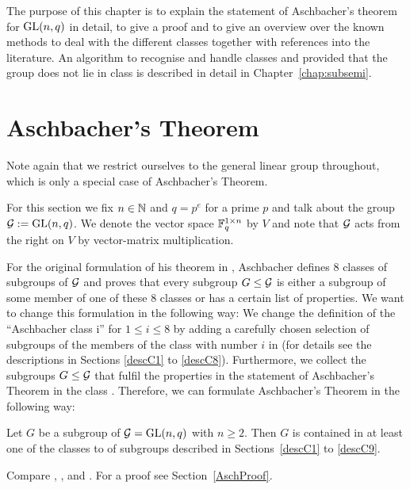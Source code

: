 The purpose of this chapter is to explain the statement of Aschbacher's 
theorem for $\GL(n,q)$ in detail, to give a proof and to give an
overview over the known methods to deal with the different classes
together with references into the literature. An algorithm to recognise
and handle classes  and  provided that the group does not lie in
class  is described in detail in Chapter~\ref{chap:subsemi}.

\section{Aschbacher's Theorem}
\label{sect:aschbacher}

Note again that we restrict ourselves to the general linear group
throughout, which is only a special case of Aschbacher's Theorem.

\begin{Not}
For this section we fix $n \in \mathbb{N}$ and $q=p^e$ for a prime $p$ and
talk about the group $\GG := \GL(n,q)$. We denote the vector space $\mathbb{F}_q^{1
\times n}$ by $V$ and note that $\mathcal{G}$ acts from the right on $V$ by
vector-matrix multiplication.
\end{Not}

For the original formulation of his theorem in \cite{aschbacher}, Aschbacher 
defines $8$ classes
of subgroups of $\mathcal{G}$ and proves that every subgroup $G \le \mathcal{G}$ is either
a subgroup of some member of one of these $8$ classes or has a certain
list of properties. We want to change this formulation in the following
way: We change the definition of the ``Aschbacher class \CC i''
for $1 \le i \le 8$ by adding a carefully chosen selection of
subgroups of the members of the class with number $i$ in \cite{aschbacher}
(for details see the descriptions in Sections \ref{descC1} to
\ref{descC8}).
Furthermore, we collect
the subgroups $G \le \mathcal{G}$ that fulfil the properties in the statement of 
Aschbacher's Theorem in the class . Therefore, we can formulate
Aschbacher's Theorem in the following way:

\begin{Theo}
\label{Asch}
Let $G$ be a subgroup of\/ $\GG = \GL(n,q)$ with $n \ge 2$.
Then $G$ is contained in at least one of the
classes  to  of subgroups described in Sections~\ref{descC1}
to \ref{descC9}.
\end{Theo}
\proofbeg Compare \cite[Appendix 2, Theorem 1]{RobPhd}, \cite{aschbacher}, 
\cite{kleilieb} and 
\cite[Theorem~1]{smashprim}. For a proof see Section~\ref{AschProof}.
\proofend

